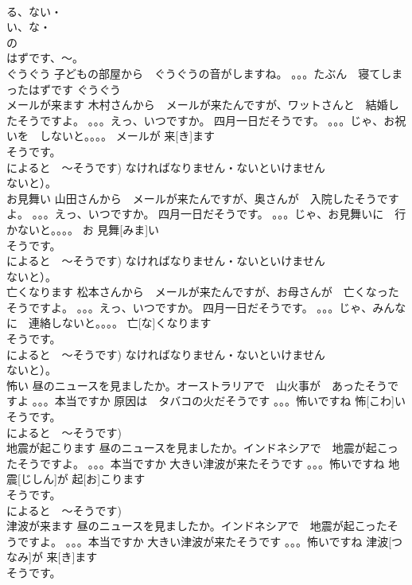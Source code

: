 \documentclass[8pt]{extreport}
\begin{document}
\begin{CJK}{UTF8}{min}
\\	る、ない・
\\	い、な・
\\	の
\\	はずです、～。
\\	ぐうぐう	子どもの部屋から　ぐうぐうの音がしますね。 。。。たぶん　寝てしまったはずです	ぐうぐう			
\\	メールが来ます	木村さんから　メールが来たんですが、ワットさんと　結婚したそうですよ。 。。。えっ、いつですか。 四月一日だそうです。 。。。じゃ、お祝いを　しないと。。。。	メールが 来[き]ます			
\\	そうです。
\\	によると　～そうです) なければなりません・ないといけません
\\	ないと）。
\\	お見舞い	山田さんから　メールが来たんですが、奥さんが　入院したそうですよ。 。。。えっ、いつですか。 四月一日だそうです。 。。。じゃ、お見舞いに　行かないと。。。。	お 見舞[みま]い			
\\	そうです。
\\	によると　～そうです) なければなりません・ないといけません
\\	ないと）。
\\	亡くなります	松本さんから　メールが来たんですが、お母さんが　亡くなったそうですよ。 。。。えっ、いつですか。 四月一日だそうです。 。。。じゃ、みんなに　連絡しないと。。。。	亡[な]くなります			
\\	そうです。
\\	によると　～そうです) なければなりません・ないといけません
\\	ないと）。
\\	怖い	昼のニュースを見ましたか。オーストラリアで　山火事が　あったそうですよ 。。。本当ですか 原因は　タバコの火だそうです 。。。怖いですね	怖[こわ]い			
\\	そうです。
\\	によると　～そうです)	
\\	地震が起こります	昼のニュースを見ましたか。インドネシアで　地震が起こったそうですよ。 。。。本当ですか 大きい津波が来たそうです 。。。怖いですね	地震[じしん]が 起[お]こります			
\\	そうです。
\\	によると　～そうです)	
\\	津波が来ます	昼のニュースを見ましたか。インドネシアで　地震が起こったそうですよ。 。。。本当ですか 大きい津波が来たそうです 。。。怖いですね	津波[つなみ]が 来[き]ます			
\\	そうです。

\end{CJK}
\end{document}
